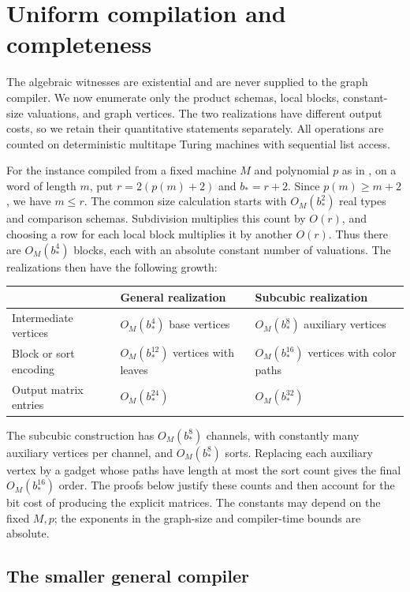 \section{Uniform compilation and completeness}\label{uniform:section}

The algebraic witnesses are existential and are never supplied to the
graph compiler. We now enumerate only the product schemas, local blocks,
constant-size valuations, and graph vertices. The two realizations have
different output costs, so we retain their quantitative statements
separately. All operations are counted on deterministic multitape
Turing machines with sequential list access.

For the instance compiled from a fixed machine $M$ and polynomial $p$
as in , on a word of length $m$, put
$r=2(p(m)+2)$ and $b_*=r+2$. Since $p(m)\ge m+2$, we have $m\le r$.
The common size calculation starts with $O_M(b_*^2)$ real types and
comparison schemas. Subdivision
multiplies this count by $O(r)$, and choosing a row for each local
block multiplies it by another $O(r)$. Thus there are $O_M(b_*^4)$
blocks, each with an absolute constant number of valuations.
The realizations then have the following growth:
\begin{center}
\begin{tabular}{@{}lll@{}}
\toprule
 & General realization & Subcubic realization\\
\midrule
Intermediate vertices & $O_M(b_*^4)$ base vertices
 & $O_M(b_*^8)$ auxiliary vertices\\
Block or sort encoding & $O_M(b_*^{12})$ vertices with leaves
 & $O_M(b_*^{16})$ vertices with color paths\\
Output matrix entries & $O_M(b_*^{24})$ & $O_M(b_*^{32})$\\
\bottomrule
\end{tabular}
\end{center}
The subcubic construction has $O_M(b_*^8)$ channels, with constantly
many auxiliary vertices per channel, and $O_M(b_*^8)$ sorts.
Replacing each auxiliary vertex by a gadget whose paths have length
at most the sort count gives the final $O_M(b_*^{16})$ order.
The proofs below justify these counts
and then account for the bit cost of producing the explicit matrices.
The constants may depend on the fixed $M,p$; the exponents in the
graph-size and compiler-time bounds are absolute.

\subsection{The smaller general compiler}

